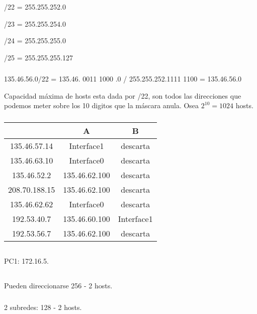 /22 = 255.255.252.0

/23 = 255.255.254.0

/24 = 255.255.255.0

/25 = 255.255.255.127

\subsubsection{}
135.46.56.0/22 = 135.46. 0011 1000 .0 / 255.255.252.1111 1100 = 135.46.56.0

Capacidad máxima de hosts esta dada por /22, son todos las direcciones que podemos meter sobre los 10 digitos que la máscara anula. Osea $2^{10} = 1024$ hosts.

\subsubsection{}
\begin{tabular}{|c|c|c|}
\hline
& A & B \\ \hline
135.46.57.14 & Interface1 & descarta \\ \hline
135.46.63.10 & Interface0 & descarta \\ \hline
135.46.52.2 & 135.46.62.100 & descarta \\ \hline
208.70.188.15 & 135.46.62.100 & descarta \\ \hline
135.46.62.62 & Interface0 & descarta \\ \hline 
192.53.40.7 & 135.46.60.100 & Interface1 \\ \hline 
192.53.56.7 & 135.46.62.100 & descarta \\ \hline 
\end{tabular}

\subsection{}
PC1: 172.16.5.

\subsection{}
\subsubsection{}
Pueden direccionarse 256 - 2 hosts.

\subsubsection{}
2 subredes: 128 - 2 hosts.

